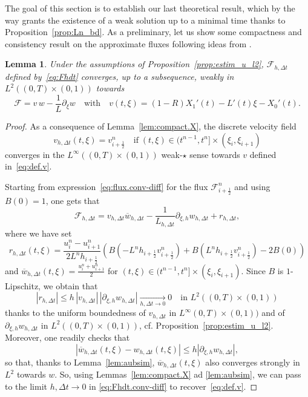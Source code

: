 \documentclass{amsart}
\newcommand\dt{\Delta t}
\newcommand\Ff{{\mathcal F}}
\newcommand\p{\partial}
\newtheorem{lemma}[theorem]{Lemma}
\begin{document}
The goal of this section is to establish our last theoretical result, which by the way grants the existence of a weak solution up to a minimal time thanks to Proposition~\ref{prop:Ln_bd}. 
As a preliminary, let us show some compactness and consistency result on the approximate fluxes following ideas from \cite[Lemma 4.4]{CHD11}.
\begin{lemma}\label{lem:conv.F}
Under the assumptions of Proposition~\ref{prop:estim_u_l2}, $\Ff_{h,\dt}$ defined by~\eqref{eq:Fhdt} converges, up to a subsequence, weakly in $L^2((0,T)\times(0,1))$ towards 
\begin{equation}\label{eq:def.v}
\Ff = v\,w - \frac1L \partial_\xi w \quad \text{with} \quad v(t,\xi) = (1-R) X_1'(t) - L'(t) \xi - X_0'(t).
\end{equation}
\end{lemma}
\begin{proof}
As a consequence of Lemma~\ref{lem:compact.X}, the discrete velocity field 
\[
v_{h,\dt}(t,\xi) = v_{i+\frac12}^n \quad \text{if}\; (t,\xi) \in (t^{n-1}, t^n] \times (\xi_i,\xi_{i+1})
\]
converges in the $L^\infty((0,T) \times (0,1))$ weak-$\star$ sense towards $v$ defined in~\eqref{eq:def.v}.

Starting from expression~\eqref{eq:flux.conv-diff} for the flux $\Ff_{i+\frac12}^n$ and using $B(0) = 1$, one gets that 
\begin{equation}\label{eq:Fhdt.conv-diff}
\Ff_{h,\dt} = v_{h,\dt} \overline  w_{h,\dt} - \frac1{L_{h,\dt}} \p_{\xi,h} w_{h,\dt} + r_{h,\dt}, 
\end{equation}
where we have set 
\[
r_{h,\dt}(t,\xi) =  \frac{u_i^n - u_{i+1}^n}{2 L^n h_{i+\frac12}} \left( B(- L^n h_{i+\frac12} v_{i+\frac12}^n) + B(L^n h_{i+\frac12} v_{i+\frac12}^n) - 2 B(0) \right) 
\]
and $\overline  w_{h,\dt}(t,\xi) =  \frac{u_i^n + u_{i+1}^n}2$ for $(t,\xi) \in (t^{n-1}, t^n] \times (\xi_i, \xi_{i+1})$.
Since $B$ is $1$-Lipschitz, we obtain that 
\[
|r_{h,\dt}| \leq h\, |v_{h,\dt}| \, |\p_{\xi,h} w_{h,\dt}| \underset{h,\dt\to 0}\longrightarrow 0 \quad \text{in } L^2((0,T) \times (0,1))
\]
thanks to the uniform boundedness of $v_{h,\dt}$ in $L^\infty(0,T) \times (0,1))$ and of $\p_{\xi,h} w_{h,\dt}$ in $L^2((0,T) \times (0,1))$, cf. Proposition~\ref{prop:estim_u_l2}. Moreover, one readily checks that 
\[
| \overline  w_{h,\dt}(t,\xi)  - w_{h,\dt}(t,\xi) | \leq h  |\p_{\xi,h} w_{h,\dt}|, 
\]
so that, thanks to Lemma~\ref{lem:aubsim}, $\overline  w_{h,\dt}(t,\xi)$ also converges strongly in $L^2$ towards $w$. So, using Lemmas~\ref{lem:compact.X} ad \ref{lem:aubsim}, we can pass to the limit $h,\dt \to 0$ in \eqref{eq:Fhdt.conv-diff} to recover~\eqref{eq:def.v}.
\end{proof}
\end{document}
